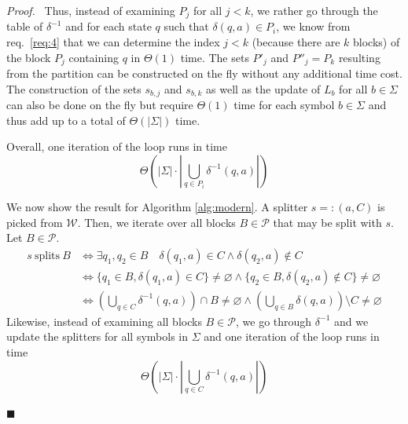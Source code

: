 \documentclass[12pt, a4 paper]{article}
\renewenvironment{proof}[1][Proof]{\begin{mdframed}[backgroundcolor=black!5, topline=false, rightline=false, bottomline=false, linecolor=black!15, linewidth=3pt]{\noindent\textit{#1.}\ }}{\noindent\par\hfill$\blacksquare$\end{mdframed}}
\theoremstyle{definition}
\begin{document}
\begin{proof}
    Thus, instead of examining $P_j$ for all $j < k$, we rather go through the table of $\delta^{-1}$ and for each state $q$ such that $\delta(q, a) \in P_i$, we know from req.\ \ref{req:4} that we can determine the index $j < k$ (because there are $k$ blocks) of the block $P_j$ containing $q$ in $\Theta(1)$ time.
    The sets $P'_j$ and $P''_j = P_k$ resulting from the partition can be constructed on the fly without any additional time cost. The construction of the sets $s_{b, j}$ and $s_{b, k}$ as well as the update of $L_b$ for all $b \in \Sigma$ can also be done on the fly but require $\Theta(1)$ time for each symbol $b \in \Sigma$ and thus add up to a total of $\Theta(\left| \Sigma \right|)$ time.

    Overall, one iteration of the loop runs in time
    $$\Theta \left( \left| \Sigma \right| \cdot \left| \bigcup_{q \in P_i} \delta^{-1}(q, a) \right| \right) $$

    \bigskip
    We now show the result for Algorithm \ref{alg:modern}. A splitter ${s =: (a, C)}$ is picked from $\mathcal{W}$.
    Then, we iterate over all blocks $B \in \mathcal{P}$ that may be split with $s$. Let $B \in \mathcal{P}$.
    \begin{align*}
        s\ \text{splits}\ B &\iff \exists q_1, q_2 \in B \quad \delta(q_1, a) \in C \land \delta(q_2, a) \notin C\\
        &\iff \{q_1 \in B, \delta(q_1, a) \in C\} \neq \varnothing \land \{q_2 \in B, \delta(q_2, a) \notin C\} \neq \varnothing \\
        &\iff \left(\bigcup_{q \in C} \delta^{-1}(q, a)\right)\cap B \neq \varnothing \land \left(\bigcup_{q \in B}\delta(q, a)\right)\setminus C \neq \varnothing
    \end{align*}
    Likewise, instead of examining all blocks $B \in \mathcal{P}$, we go through $\delta^{-1}$ and we update the splitters for all symbols in $\Sigma$ and one iteration of the loop runs in time
    $$\Theta \left( \left| \Sigma \right| \cdot \left| \bigcup_{q \in C} \delta^{-1}(q, a) \right| \right) $$
\end{proof}

\newcommand{\preds}[2]{\ensuremath{\overset{\hookleftarrow {#1}}{#2}}}
\end{document}
